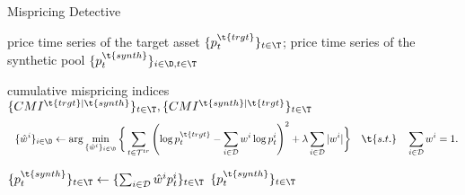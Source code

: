 \begin{algorithm}[H]
\caption{Mispricing Detective}
\label{alg:mispricing_detective}
\begin{algorithmic}[1]
\Require
price time series of the target asset $\{p^{\t{trgt}}_{t}\}_{t \in \T}$;
price time series of the synthetic pool $\{p^{\t{synth}}_{t}\}_{i\in\D, t \in \T}$

\mx 
\Ensure cumulative mispricing indices 
$\{
CMI^{\t{trgt}|\t{synth}}
\}_{t \in \T}
, 
\{
CMI^{\t{synth}|\t{trgt}}
\}_{t \in \T}$
\mx 
{}
$$
~~\{ \hat w^{i} \}_{i\in \D}
\gets  \arg \min_
{\{ \hat w^i \}_{i\in\D}}
\bigg{\{}
\sum_{t\in \mathcal T^{tr}}
\left(
\log p_{t}^\t{trgt}
- 
\sum_{i\in \mathcal D}
w^i \log p_{t}^i
\right)^2
+ 
\lambda \sum_{i\in\mathcal D} |w^i|
\bigg{\}}
\quad 
\t{s.t.}
\quad 
\sum_{i\in\mathcal D} w^i=1
.
$$

$
\{ p^{\t{synth}}_t \}_{t\in\T} \gets  
\{\sum_{i\in \mathcal D} \hat w^i p_{t}^i \}_{t\in\T}
$
\mx 
    \State \Return $\{ p^{\t{synth}}_t \}_{t\in\T}$
\EndFunction
\end{algorithmic}
\end{algorithm}